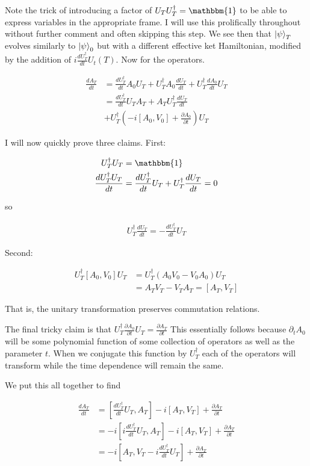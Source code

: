 \documentclass[12pt]{article}
\newcommand{\ddt}[1]{\frac{d #1}{dt}}
\begin{document}
Note the trick of introducing a factor of $U_TU_T^{\dag} = \mathbbm{1}$ to be able to express variables in the appropriate frame. I will use this prolifically throughout without further comment and often skipping this step.
We see then that $\ket{\psi}_T$ evolves similarly to $\ket{\psi}_0$ but with a different effective ket Hamiltonian, modified by the addition of $i \ddt{U_T^{\dag}} U_t(T)$. Now for the operators.

\begin{align}
\ddt{A_T} &= \ddt{U_T^{\dag}}A_0U_T + U_T^{\dag}A_0\ddt{U_T} + U_T^{\dag} \ddt{A_0} U_T\\
&= \ddt{U_T^{\dag}} U_TA_T + A_T U_T^{\dag} \ddt{U_T}\\
&+ U_T^{\dag} \left(-i[A_0,V_0] + \frac{\partial A_0}{\partial t}\right)U_T
\end{align}

I will now quickly prove three claims.  First:

\begin{align}
U_T^{\dag} U_T &= \mathbbm{1}\\
\ddt{U_T^{\dag} U_T} &= \ddt{U_T^{\dag}}U_T + U_T^{\dag} \ddt{U_T} = 0
\end{align}

so

\begin{align}
U_T^{\dag} \ddt{U_T} = - \ddt{U_T^{\dag}} U_T
\end{align}

Second:

\begin{align}
U_T^{\dag}[A_0,V_0]U_T &= U_T^{\dag}(A_0V_0 - V_0A_0)U_T\\
&= A_TV_T - V_TA_T = [A_T,V_T]
\end{align}

That is, the unitary transformation preserves commutation relations.

The final tricky claim is that $U_T^{\dag} \frac{\partial A_0}{\partial t} U_T = \frac{\partial A_T}{\partial t}$ This essentially follows because $\partial_t A_0$ will be some polynomial function of some collection of operators as well as the parameter $t$. When we conjugate this function by $U_T^{\dag}$ each of the operators will transform while the time dependence will remain the same.

We put this all together to find

\begin{align}
\ddt{A_T} &= \left[\ddt{U_T^{\dag}}U_T,A_T \right] -i [A_T,V_T] + \frac{\partial A_T}{\partial t}\\
&= -i  \left[i\ddt{U_T^{\dag}}U_T,A_T \right] -i [A_T,V_T] + \frac{\partial A_T}{\partial t}\\
&= -i \left[A_T, V_T - i \ddt{U_T^{\dag}}U_T\right] + \frac{\partial A_T}{\partial t}
\end{align}
\end{document}
